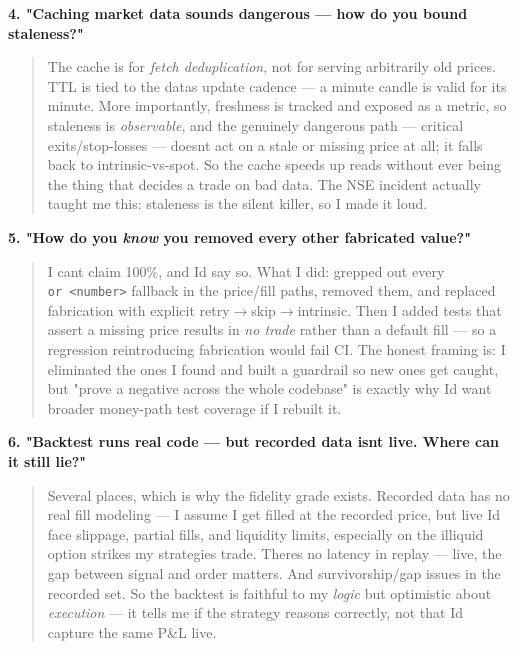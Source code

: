 \documentclass[11pt]{article}
\begin{document}
\textbf{4. "Caching market data sounds dangerous --- how do you bound staleness?"}

\begin{quote}
The cache is for \emph{fetch deduplication}, not for serving arbitrarily old prices. TTL is tied to the
data\textquotesingle s update cadence --- a minute candle is valid for its minute. More importantly, freshness is
tracked and exposed as a metric, so staleness is \emph{observable}, and the genuinely dangerous path ---
critical exits/stop-losses --- doesn\textquotesingle t act on a stale or missing price at all; it falls back to
intrinsic-vs-spot. So the cache speeds up reads without ever being the thing that decides a trade
on bad data. The NSE incident actually taught me this: staleness is the silent killer, so I made
it loud.
\end{quote}

\textbf{5. "How do you \emph{know} you removed every other fabricated value?"}

\begin{quote}
I can\textquotesingle t claim 100\%, and I\textquotesingle d say so. What I did: grepped out every \texttt{or\ \textless{}number\textgreater{}} fallback in the
price/fill paths, removed them, and replaced fabrication with explicit retry\(\rightarrow\)skip\(\rightarrow\)intrinsic. Then
I added tests that assert a missing price results in \emph{no trade} rather than a default fill --- so a
regression reintroducing fabrication would fail CI. The honest framing is: I eliminated the ones I
found and built a guardrail so new ones get caught, but "prove a negative across the whole
codebase" is exactly why I\textquotesingle d want broader money-path test coverage if I rebuilt it.
\end{quote}

\textbf{6. "Backtest runs real code --- but recorded data isn\textquotesingle t live. Where can it still lie?"}

\begin{quote}
Several places, which is why the fidelity grade exists. Recorded data has no real fill modeling ---
I assume I get filled at the recorded price, but live I\textquotesingle d face slippage, partial fills, and
liquidity limits, especially on the illiquid option strikes my strategies trade. There\textquotesingle s no
latency in replay --- live, the gap between signal and order matters. And survivorship/gap issues in
the recorded set. So the backtest is faithful to my \emph{logic} but optimistic about \emph{execution} --- it
tells me if the strategy reasons correctly, not that I\textquotesingle d capture the same P\&L live.
\end{quote}
\end{document}
